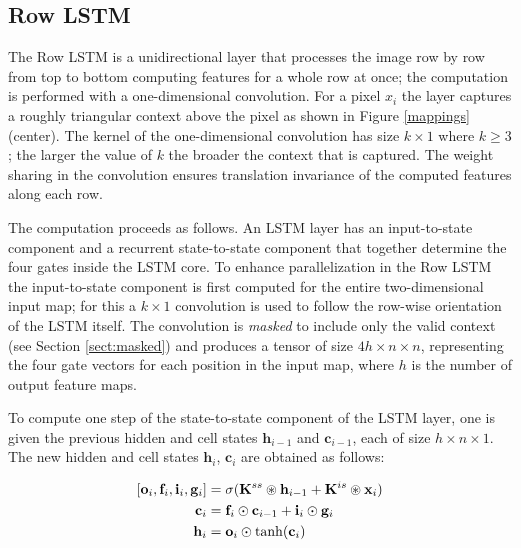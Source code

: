 \documentclass{article}
\renewcommand{\vec}{\mathbf}
\begin{document}
\subsection{Row LSTM}
\label{sect:row_lstm}

The Row LSTM is a unidirectional layer that processes the image row by row from top to bottom computing features for a whole row at once; the computation is performed with a one-dimensional convolution. For a pixel $x_i$ the layer captures a roughly triangular context above the pixel as shown in Figure \ref{mappings} (center). The kernel of the one-dimensional convolution has size $k \times 1$ where $k \geq 3$; the larger the value of $k$ the broader the context that is captured. The weight sharing in the convolution ensures translation invariance of the computed features along each row.

The computation proceeds as follows. An LSTM layer has an {input-to-state} component and a recurrent {state-to-state} component that together determine the four gates inside the LSTM core. To enhance parallelization in the Row LSTM the input-to-state component is first computed for the entire two-dimensional input map; for this a $k \times 1$ convolution is used to follow the row-wise orientation of the LSTM itself. The convolution is \emph{masked} to include only the valid context (see Section \ref{sect:masked}) and produces a tensor of size $4h \times n \times n$, representing the four gate vectors for each position in the input map, where $h$ is the number of output feature maps.

 To compute one step of the state-to-state component of the LSTM layer, one is given the previous hidden and cell states $\vec{h}_{i-1}$ and $\vec{c}_{i-1}$, each of size $h \times n \times 1$. The new hidden and cell states $\vec{h}_i$, $\vec{c}_i$ are obtained as follows:

 \vspace{-0.2cm}
 \begin{equation}
 \begin{split}
 [\vec{o}_i, \vec{f}_i, \vec{i}_i, \vec{g}_i ] & = \sigma (\vec{K}^{ss} \circledast \vec{h}_{i-1} + \vec{K}^{is} \circledast \vec{x}_{i}) \\
\vec{c}_i & = \vec{f}_i \odot \vec{c}_{i-1} + \vec{i}_i \odot \vec{g}_i \\
\vec{h}_i & = \vec{o}_i \odot \tanh(\vec{c}_i)\\
\end{split}
\label{eq:lstm}
 \vspace{-0.3cm}
 \end{equation}
\end{document}
